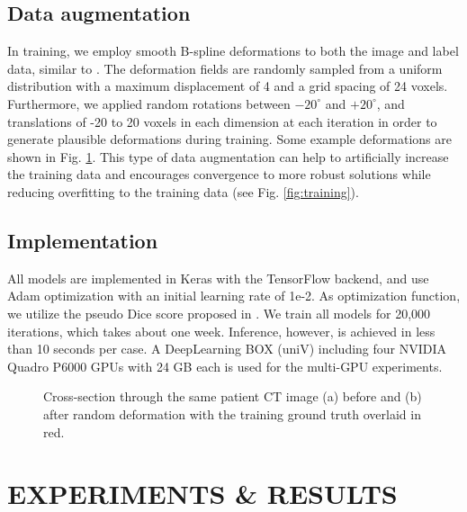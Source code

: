 \documentclass[a4paper]{spie}  %
\begin{document}
\subsection{Data augmentation} In training, we employ smooth B-spline deformations to both the image and label data, similar to \cite{cciccek20163d}. The deformation fields are randomly sampled from a uniform distribution with a maximum displacement of 4 and a grid spacing of 24 voxels. Furthermore, we applied random rotations between $-20^{\circ}$ and $+20^{\circ}$, and translations of -20 to 20 voxels in each dimension at each iteration in order to generate plausible deformations during training. Some example deformations are shown in Fig. \ref{fig:deform}. This type of data augmentation can help to artificially increase the training data and encourages convergence to more robust solutions while reducing overfitting to the training data (see Fig. \ref{fig:training}). 

\subsection{Implementation} All models are implemented in Keras with the TensorFlow backend, and use Adam optimization \cite{kingma2014adam} with an initial learning rate of 1e-2. As optimization function, we utilize the pseudo Dice score proposed in \cite{milletari2016v}. We train all models for 20,000 iterations, which takes about one week. Inference, however, is achieved in less than 10 seconds per case. A DeepLearning BOX (uniV) including four NVIDIA Quadro P6000 GPUs with 24 GB each is used for the multi-GPU experiments.

\begin{figure}[htb]
  \centering
	\hspace{2em}
    \vspace{1em}
\caption{ Cross-section through the same patient CT image (a) before and (b) after random deformation with the training ground truth overlaid in red. \label{fig:deform}}
\end{figure}
\section{EXPERIMENTS \& RESULTS}
\end{document}
